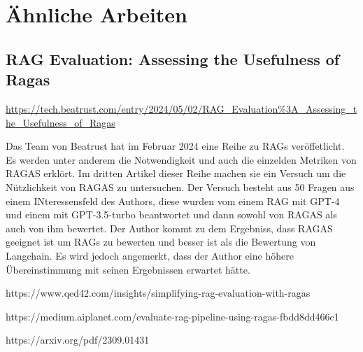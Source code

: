 \chapter{Ähnliche Arbeiten}

\section{RAG Evaluation: Assessing the Usefulness of Ragas}
\url{https://tech.beatrust.com/entry/2024/05/02/RAG_Evaluation%3A_Assessing_the_Usefulness_of_Ragas}


Das Team von Beatrust hat im Februar 2024 eine Reihe zu RAGs veröffetlicht. Es werden unter anderem die Notwendigkeit und auch die einzelden Metriken von RAGAS erklört.
Im dritten Artikel dieser Reihe machen sie ein Versuch um die Nützlichkeit von RAGAS zu untersuchen.  
Der Versuch besteht aus 50 Fragen aus einem INteressensfeld des Authors, diese wurden vom einem RAG mit GPT-4 und einem mit GPT-3.5-turbo beantwortet und dann sowohl von RAGAS als auch von ihm bewertet.
Der Author kommt zu dem Ergebniss, dass RAGAS geeignet ist um RAGs zu bewerten und besser ist als die Bewertung von Langchain. Es wird jedoch angemerkt, dass der Author eine höhere Übereinstimmung mit seinen Ergebnissen erwartet hätte.


https://www.qed42.com/insights/simplifying-rag-evaluation-with-ragas


https://medium.aiplanet.com/evaluate-rag-pipeline-using-ragas-fbdd8dd466c1


https://arxiv.org/pdf/2309.01431